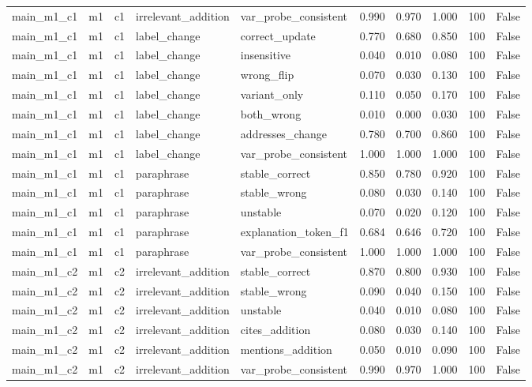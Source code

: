 \begin{tabular}{llllllllll}
main\_m1\_c1 & m1 & c1 & irrelevant\_addition & var\_probe\_consistent & 0.990 & 0.970 & 1.000 & 100 & False \\
main\_m1\_c1 & m1 & c1 & label\_change & correct\_update & 0.770 & 0.680 & 0.850 & 100 & False \\
main\_m1\_c1 & m1 & c1 & label\_change & insensitive & 0.040 & 0.010 & 0.080 & 100 & False \\
main\_m1\_c1 & m1 & c1 & label\_change & wrong\_flip & 0.070 & 0.030 & 0.130 & 100 & False \\
main\_m1\_c1 & m1 & c1 & label\_change & variant\_only & 0.110 & 0.050 & 0.170 & 100 & False \\
main\_m1\_c1 & m1 & c1 & label\_change & both\_wrong & 0.010 & 0.000 & 0.030 & 100 & False \\
main\_m1\_c1 & m1 & c1 & label\_change & addresses\_change & 0.780 & 0.700 & 0.860 & 100 & False \\
main\_m1\_c1 & m1 & c1 & label\_change & var\_probe\_consistent & 1.000 & 1.000 & 1.000 & 100 & False \\
main\_m1\_c1 & m1 & c1 & paraphrase & stable\_correct & 0.850 & 0.780 & 0.920 & 100 & False \\
main\_m1\_c1 & m1 & c1 & paraphrase & stable\_wrong & 0.080 & 0.030 & 0.140 & 100 & False \\
main\_m1\_c1 & m1 & c1 & paraphrase & unstable & 0.070 & 0.020 & 0.120 & 100 & False \\
main\_m1\_c1 & m1 & c1 & paraphrase & explanation\_token\_f1 & 0.684 & 0.646 & 0.720 & 100 & False \\
main\_m1\_c1 & m1 & c1 & paraphrase & var\_probe\_consistent & 1.000 & 1.000 & 1.000 & 100 & False \\
main\_m1\_c2 & m1 & c2 & irrelevant\_addition & stable\_correct & 0.870 & 0.800 & 0.930 & 100 & False \\
main\_m1\_c2 & m1 & c2 & irrelevant\_addition & stable\_wrong & 0.090 & 0.040 & 0.150 & 100 & False \\
main\_m1\_c2 & m1 & c2 & irrelevant\_addition & unstable & 0.040 & 0.010 & 0.080 & 100 & False \\
main\_m1\_c2 & m1 & c2 & irrelevant\_addition & cites\_addition & 0.080 & 0.030 & 0.140 & 100 & False \\
main\_m1\_c2 & m1 & c2 & irrelevant\_addition & mentions\_addition & 0.050 & 0.010 & 0.090 & 100 & False \\
main\_m1\_c2 & m1 & c2 & irrelevant\_addition & var\_probe\_consistent & 0.990 & 0.970 & 1.000 & 100 & False \\

\end{tabular}
